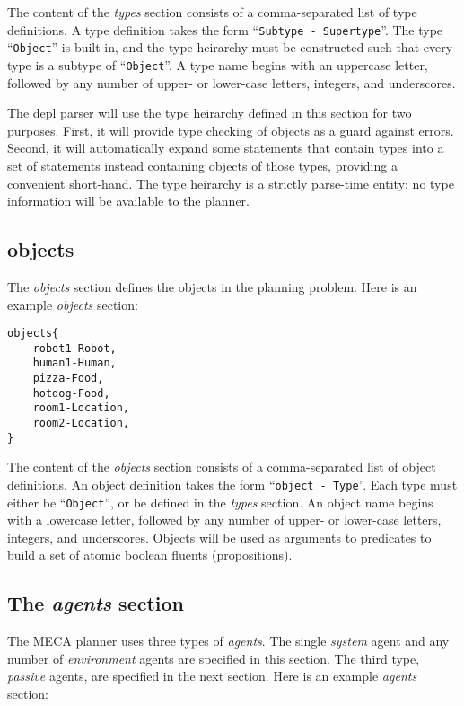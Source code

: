 \documentclass{article}
\begin{document}
The content of the \emph{types} section consists of a comma-separated list of
type definitions. A type definition takes the form
``\texttt{Subtype - Supertype}''.
The type ``\texttt{Object}'' is built-in, and
the type heirarchy must be constructed such that every type is a subtype of
``\texttt{Object}''.  A type name begins with an uppercase letter, followed
by any number of upper- or lower-case letters, integers, and underscores.

The depl parser will use the type heirarchy defined in this section for two 
purposes. First, it will provide type checking of objects as a guard against errors.
Second, it will automatically expand some
statements that contain types into a set of statements instead containing
objects of those types, providing a convenient short-hand. 
The type heirarchy is a strictly parse-time entity: no type information will be
available to the planner.


\subsection{objects}

The \emph{objects} section defines the objects in the planning problem.
Here is an example \emph{objects} section:
\begin{verbatim}
objects{
    robot1-Robot,
    human1-Human,
    pizza-Food,
    hotdog-Food,
    room1-Location,
    room2-Location,
}
\end{verbatim}

The content of the \emph{objects} section consists of a comma-separated list of
object definitions. An object definition takes the form ``\texttt{object -
Type}''. Each type must
either be ``\texttt{Object}'', or be defined in the \emph{types} section.  An
object name begins with a lowercase letter, followed by any number of upper-
or lower-case letters, integers, and underscores.
Objects will be used as arguments to predicates to build a set of atomic
boolean fluents (propositions).


\subsection{The \emph{agents} section}

The MECA planner uses three types of \emph{agents}. The single
\emph{system} agent and any number of \emph{environment} agents are specified in
this section.  The third type, \emph{passive} agents, are specified in the next
section.  Here is an example \emph{agents} section:
\end{document}
